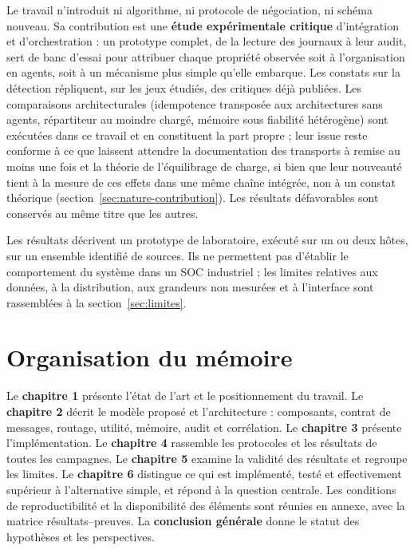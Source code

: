 
Le travail n'introduit ni algorithme, ni protocole de négociation, ni schéma nouveau. Sa contribution est une \textbf{étude expérimentale critique} d'intégration et d'orchestration : un prototype complet, de la lecture des journaux à leur audit, sert de banc d'essai pour attribuer chaque propriété observée soit à l'organisation en agents, soit à un mécanisme plus simple qu'elle embarque. Les constats sur la détection répliquent, sur les jeux étudiés, des critiques déjà publiées. Les comparaisons architecturales (idempotence transposée aux architectures sans agents, répartiteur au moindre chargé, mémoire sous fiabilité hétérogène) sont exécutées dans ce travail et en constituent la part propre ; leur issue reste conforme à ce que laissent attendre la documentation des transports à remise au moins une fois et la théorie de l'équilibrage de charge, si bien que leur nouveauté tient à la mesure de ces effets dans une même chaîne intégrée, non à un constat théorique (section~\ref{sec:nature-contribution}). Les résultats défavorables sont conservés au même titre que les autres.

Les résultats décrivent un prototype de laboratoire, exécuté sur un ou deux hôtes, sur un ensemble identifié de sources. Ils ne permettent pas d'établir le comportement du système dans un SOC industriel ; les limites relatives aux données, à la distribution, aux grandeurs non mesurées et à l'interface sont rassemblées à la section~\ref{sec:limites}.


\section*{Organisation du mémoire}


Le \textbf{chapitre 1} présente l'état de l'art et le positionnement du travail. Le \textbf{chapitre 2} décrit le modèle proposé et l'architecture : composants, contrat de messages, routage, utilité, mémoire, audit et corrélation. Le \textbf{chapitre 3} présente l'implémentation. Le \textbf{chapitre 4} rassemble les protocoles et les résultats de toutes les campagnes. Le \textbf{chapitre 5} examine la validité des résultats et regroupe les limites. Le \textbf{chapitre 6} distingue ce qui est implémenté, testé et effectivement supérieur à l'alternative simple, et répond à la question centrale. Les conditions de reproductibilité et la disponibilité des éléments sont réunies en annexe, avec la matrice résultats--preuves. La \textbf{conclusion générale} donne le statut des hypothèses et les perspectives.
